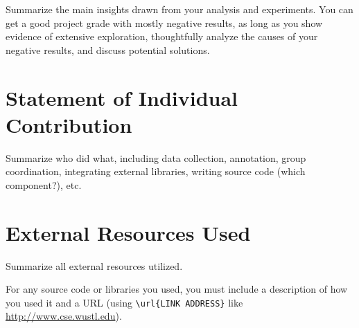 \documentclass[10pt,twocolumn,letterpaper]{article}
\begin{document}
Summarize the main insights drawn from your analysis and experiments. You can get a good project grade with mostly negative results, as long as you show evidence of extensive exploration, thoughtfully analyze the causes of your negative results, and discuss potential solutions.


\section{Statement of Individual Contribution}

Summarize who did what, including data collection, annotation, group coordination, integrating external libraries, writing source code (which component?), etc.

\section{External Resources Used}

Summarize all external resources utilized.

For any source code or libraries you used, you must include a description of how you used it and a URL (using \verb|\url{LINK ADDRESS}| like \url{http://www.cse.wustl.edu}).

{\small


}
\end{document}
